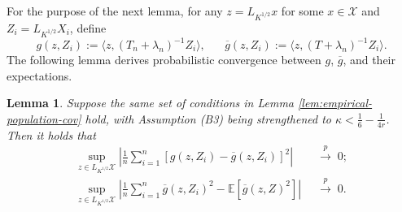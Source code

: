 \documentclass[11pt,a4paper]{article}
\renewcommand{\bar}{\overline}
\theoremstyle{definition}
\theoremstyle{plain}
\newtheorem{lemma}{Lemma}[section]
\theoremstyle{remark}
\newcommand{\mX}{\mathcal X}
\begin{document}
For the purpose of the next lemma, for any $z=L_{K^{1/2}}x$ for some $x\in\mathcal X$ and $Z_i=L_{K^{1/2}}X_i$, define
$$
g(z,Z_i) := \langle z, (T_n+\lambda_n)^{-1}Z_i\rangle,\;\;\;\;\;\;\bar g(z,Z_i) := \langle z, (T+\lambda_n)^{-1}Z_i\rangle.
$$
The following lemma derives probabilistic convergence between $g$, $\bar g$, and their expectations.
\begin{lemma}
Suppose the same set of conditions in Lemma \ref{lem:empirical-population-cov} hold, with Assumption (B3) being strengthened to $\kappa<\frac{1}{6}-\frac{1}{4r}$. 
Then it holds that
\begin{align*}
\sup_{z\in L_{K^{1/2}}\mX}\left|\frac{1}{n}\sum_{i=1}^n [g(z,Z_i)-\bar g(z,Z_i)]^2\right|\;\;&\overset{p}{\to}\;0;\\
\sup_{z\in L_{K^{1/2}}\mX}\left|\frac{1}{n}\sum_{i=1}^n \bar g(z,Z_i)^2-\mathbb E[\bar g(z,Z)^2]\right|\;\;&\overset{p}{\to}\; 0.
\end{align*}
\label{lem:gdiff}
\end{lemma}
\end{document}
